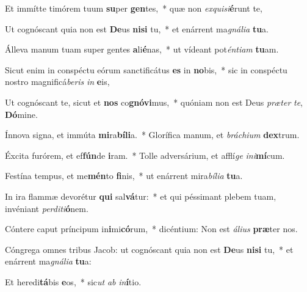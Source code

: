 \item Et immítte timórem tuum \textbf{su}per \textbf{gen}tes,~* quæ non \textit{ex}\textit{qui}\textit{si}\textbf{é}runt te,
\item Ut cognóscant quia non est \textbf{De}us \textbf{ni}\textbf{si} tu,~* et enárrent ma\textit{gná}\textit{li}\textit{a} \textbf{tu}a.
\item Álleva manum tuam super gentes \textbf{a}li\textbf{é}nas,~* ut vídeant pot\textit{én}\textit{ti}\textit{am} \textbf{tu}am.
\item Sicut enim in conspéctu eórum sanctificátus \textbf{es} in \textbf{no}bis,~* sic in conspéctu nostro magnificá\textit{be}\textit{ris} \textit{in} \textbf{e}is,
\item Ut cognóscant te, sicut et \textbf{nos} co\textbf{gnó}\textbf{vi}mus,~* quóniam non est Deus \textit{præ}\textit{ter} \textit{te}, \textbf{Dó}mine.
\item Ínnova signa, et immúta \textbf{mi}ra\textbf{bí}\textbf{li}a.~* Glorífica manum, et \textit{brá}\textit{chi}\textit{um} \textbf{dex}trum.
\item Éxcita furórem, et ef\textbf{fún}de \textbf{i}ram.~* Tolle adversárium, et afflí\textit{ge} \textit{in}\textit{i}\textbf{mí}cum.
\item Festína tempus, et me\textbf{mén}to \textbf{fi}nis,~* ut enárrent mira\textit{bí}\textit{li}\textit{a} \textbf{tu}a.
\item In ira flammæ devorétur \textbf{qui} sal\textbf{vá}tur:~* et qui péssimant plebem tuam, invéniant \textit{per}\textit{di}\textit{ti}\textbf{ó}nem.
\item Cóntere caput príncipum in\textbf{i}mi\textbf{có}rum,~* dicéntium: Non est \textit{á}\textit{li}\textit{us} \textbf{præ}ter nos.
\item Cóngrega omnes tribus Jacob: ut cognóscant quia non est \textbf{De}us \textbf{ni}\textbf{si} tu,~* et enárrent ma\textit{gná}\textit{li}\textit{a} \textbf{tu}a:
\item Et heredi\textbf{tá}bis \textbf{e}os,~* sic\textit{ut} \textit{ab} \textit{in}\textbf{í}tio.
